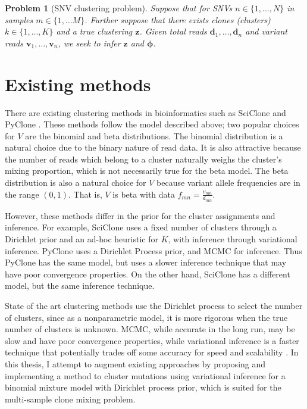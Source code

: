 \documentclass[11pt]{article}
\newcommand{\bz}{\ensuremath{\mathbf{z}}}
\newcommand{\bphi}{\ensuremath{\bm{\phi}}}
\newtheorem*{problem*}{Problem}
\begin{document}
\newpage

\begin{problem*}[SNV clustering problem]
Suppose that for SNVs $n \in \{1, ..., N\}$ in samples $m\in\{1, \ldots M\}$. Further suppose that there exists clones (clusters) $k\in\{1,\ldots,K\}$ and a true clustering $\bz$. Given total reads $\bm{d}_1, \ldots, \bm{d}_n$ and variant reads $\bm{v}_1, \ldots, \bm{v}_n$, we seek to infer $\bm{z}$ and $\bphi$.
\end{problem*}

\section{Existing methods}

There are existing clustering methods in bioinformatics such as SciClone and PyClone \cite{SciClone, PyClone}. These methods follow the model described above; two popular choices for $V$ are the binomial and beta distributions. The binomial distribution is a natural choice due to the binary nature of read data. It is also attractive because the number of reads which belong to a cluster naturally weighs the cluster's mixing proportion, which is not necessarily true for the beta model. The beta distribution is also a natural choice for $V$ because variant allele frequencies are in the range $(0,1)$. That is, $V$ is beta with data $f_{mn} = \frac{v_{mn}}{d_{mn}}$. 

However, these methods differ in the prior for the cluster assignments and inference. For example, SciClone uses a fixed number of clusters through a Dirichlet prior and an ad-hoc heuristic for $K$, with inference through variational inference. PyClone uses a Dirichlet Process prior, and MCMC for inference. Thus PyClone has the same model, but uses a slower inference technique that may have poor convergence properties. On the other hand, SciClone has a different model, but the same inference technique.

State of the art clustering methods use the Dirichlet process to select the number of clusters, since as a nonparametric model, it is more rigorous when the true number of clusters is unknown. MCMC, while accurate in the long run, may be slow and have poor convergence properties, while variational inference is a faster technique that potentially trades off some accuracy for speed and scalability \cite{Jordan1999}. In this thesis, I attempt to augment existing approaches by proposing and implementing a method to cluster mutations using variational inference for a binomial mixture model with Dirichlet process prior, which is suited for the multi-sample clone mixing problem.
\end{document}
